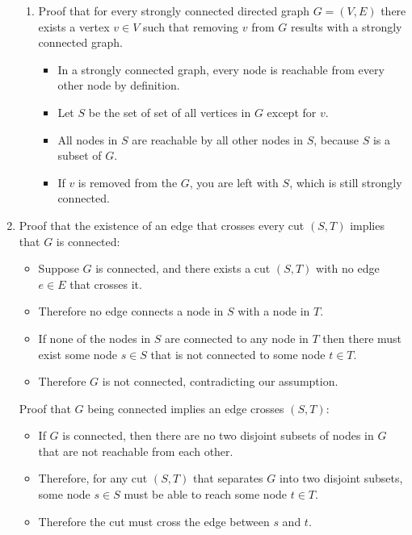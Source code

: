 \documentclass[a4paper, 10pt]{article}
\begin{document}
\begin{enumerate}
\begin{enumerate}
			\item Proof that for every strongly connected directed graph $G =
				(V, E)$ there exists a vertex $v \in V$ such that removing $v$
				from $G$ results with a strongly connected graph.

				\begin{itemize}
					\item In a strongly connected graph, every node is reachable
						from every other node by definition.
					\item Let $S$ be the set of set of all vertices in $G$
						except for $v$.
					\item All nodes in $S$ are reachable by all other nodes in
						$S$, because $S$ is a subset of $G$.
					\item If $v$ is removed from the $G$, you are left with $S$,
						which is still strongly connected.
				\end{itemize}
		\end{enumerate}


	\item Proof that the existence of an edge that crosses every cut $(S, T)$
		implies that $G$ is connected:

		\begin{itemize}
			\item Suppose $G$ is connected, and there exists a cut $(S, T)$ with
				no edge $e \in E$ that crosses it.
			\item Therefore no edge connects a node in $S$ with a node in $T$.
			\item If none of the nodes in $S$ are connected to any node in $T$
				then there must exist some node $s \in S$ that is not connected
				to some node $t \in T$.
			\item Therefore $G$ is not connected, contradicting our assumption.
		\end{itemize}

		Proof that $G$ being connected implies an edge crosses $(S, T)$:

		\begin{itemize}
			\item If $G$ is connected, then there are no two disjoint subsets of
				nodes in $G$ that are not reachable from each other.
			\item Therefore, for any cut $(S, T)$ that separates $G$ into two
				disjoint subsets, some node $s \in S$ must be able to reach some
				node $t \in T$.
			\item Therefore the cut must cross the edge between $s$ and $t$.
		\end{itemize}
\end{enumerate}
\end{document}
